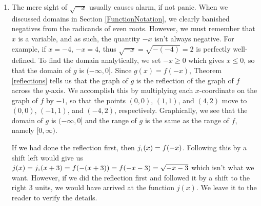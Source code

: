 {
\begin{enumerate}

\item  The mere sight of $\sqrt{-x}$ usually causes alarm, if not panic.  When we discussed domains in Section \ref{FunctionNotation}, we clearly banished negatives from the radicands of even roots.  However, we must remember that $x$ is a variable, and as such, the quantity $-x$ isn't always negative. For example, if $x=-4$, $-x = 4$, thus $\sqrt{-x} = \sqrt{-(-4)} = 2$ is perfectly well-defined.  To find the domain analytically, we set $-x \geq 0$ which gives  $x \leq 0$, so that the domain of $g$ is $(-\infty, 0]$.  Since $g(x) = f(-x)$, Theorem \ref{reflections} tells us that the graph of $g$ is the reflection of the graph of $f$ across the $y$-axis.  We accomplish this by multiplying each $x$-coordinate on the graph of $f$ by $-1$, so that the points $(0,0)$, $(1,1)$, and $(4,2)$ move to $(0,0)$, $(-1,1)$, and $(-4,2)$, respectively.  Graphically, we see that the domain of $g$ is $(-\infty, 0]$ and the range of $g$ is the same as the range of $f$, namely $[0,\infty)$.




If we had done the reflection first, then $j_{\mbox{\tiny$1$}}(x) = f(-x)$.  Following this by a shift left would give us $j(x) = j_{\mbox{\tiny$1$}}(x+3) = f(-(x+3)) = f(-x-3) = \sqrt{-x-3}$ which isn't what we want.  However, if we did the reflection first and followed it by a shift to the right $3$ units, we would have arrived at the function $j(x)$.  We leave it to the reader to verify the details.


\end{enumerate}}
